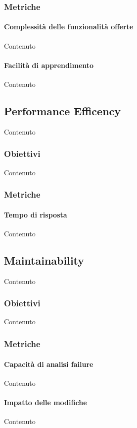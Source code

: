     \subsubsection{Metriche} %

    \paragraph{Complessit\`a delle funzionalit\`a offerte}
    Contenuto

    \paragraph{Facilit\`a di apprendimento}
    Contenuto


    \subsection{Performance Efficency}
    Contenuto

    \subsubsection{Obiettivi}
    Contenuto


    \subsubsection{Metriche} %

    \paragraph{Tempo di risposta}
    Contenuto


    \subsection{Maintainability}
    Contenuto

    \subsubsection{Obiettivi}
    Contenuto


    \subsubsection{Metriche} %

    \paragraph{Capacit\`a di analisi failure}
    Contenuto

    \paragraph{Impatto delle modifiche}
    Contenuto

